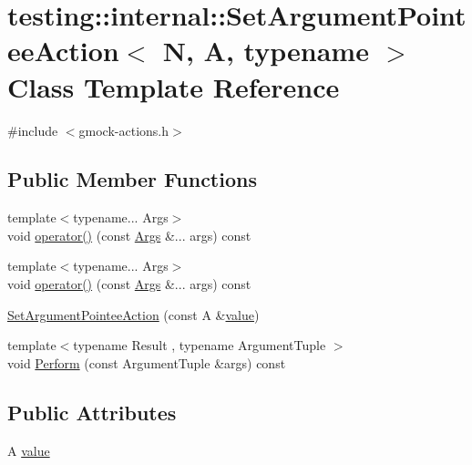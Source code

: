 \hypertarget{structtesting_1_1internal_1_1_set_argument_pointee_action}{}\section{testing\+::internal\+::Set\+Argument\+Pointee\+Action$<$ N, A, typename $>$ Class Template Reference}
\label{structtesting_1_1internal_1_1_set_argument_pointee_action}


{\ttfamily \#include $<$gmock-\/actions.\+h$>$}

\subsection*{Public Member Functions}
\begin{DoxyCompactItemize}
\item 
{\footnotesize template$<$typename... Args$>$ }\\void \mbox{\hyperlink{structtesting_1_1internal_1_1_set_argument_pointee_action_ae3810c11f1d85e57d1466c7d6b214495}{operator()}} (const \mbox{\hyperlink{namespacetesting_aaca153f67b689b8b9d5b8c67ecf8cee4}{Args}} \&... args) const
\item 
{\footnotesize template$<$typename... Args$>$ }\\void \mbox{\hyperlink{structtesting_1_1internal_1_1_set_argument_pointee_action_ae3810c11f1d85e57d1466c7d6b214495}{operator()}} (const \mbox{\hyperlink{namespacetesting_aaca153f67b689b8b9d5b8c67ecf8cee4}{Args}} \&... args) const
\item 
\mbox{\hyperlink{structtesting_1_1internal_1_1_set_argument_pointee_action_a2432930a863ed840d2ca6a203972ab0a}{Set\+Argument\+Pointee\+Action}} (const A \&\mbox{\hyperlink{structtesting_1_1internal_1_1_set_argument_pointee_action_ada437b06f7f7e1acd8b304a2b697f700}{value}})
\item 
{\footnotesize template$<$typename Result , typename Argument\+Tuple $>$ }\\void \mbox{\hyperlink{structtesting_1_1internal_1_1_set_argument_pointee_action_a675b08aa63dbca5551e5954ca3526979}{Perform}} (const Argument\+Tuple \&args) const
\end{DoxyCompactItemize}
\subsection*{Public Attributes}
\begin{DoxyCompactItemize}
\item 
A \mbox{\hyperlink{structtesting_1_1internal_1_1_set_argument_pointee_action_ada437b06f7f7e1acd8b304a2b697f700}{value}}
\end{DoxyCompactItemize}
